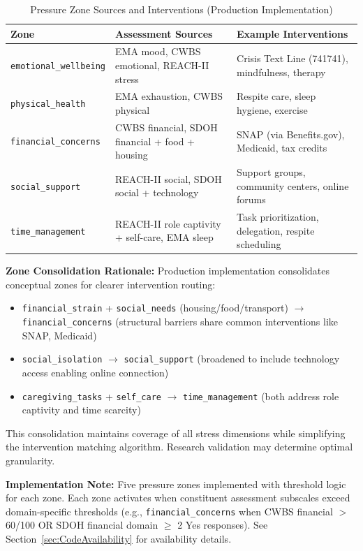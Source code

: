 \documentclass{article}
\begin{document}
\begin{table}[htbp]
\centering
\caption{Pressure Zone Sources and Interventions (Production Implementation)}
\label{table:pressure_zones}
\small
\begin{tabular}{lp{4.5cm}p{4.5cm}}
\toprule
\textbf{Zone} & \textbf{Assessment Sources} & \textbf{Example Interventions} \\
\midrule
\texttt{emotional\_wellbeing} & EMA mood, CWBS emotional, REACH-II stress & Crisis Text Line (741741), mindfulness, therapy \\
\texttt{physical\_health} & EMA exhaustion, CWBS physical & Respite care, sleep hygiene, exercise \\
\texttt{financial\_concerns} & CWBS financial, SDOH financial + food + housing & SNAP (via Benefits.gov), Medicaid, tax credits \\
\texttt{social\_support} & REACH-II social, SDOH social + technology & Support groups, community centers, online forums \\
\texttt{time\_management} & REACH-II role captivity + self-care, EMA sleep & Task prioritization, delegation, respite scheduling \\
\bottomrule
\end{tabular}
\end{table}
\textbf{Zone Consolidation Rationale:} Production implementation consolidates conceptual zones for clearer intervention routing:
\begin{itemize}
    \item \texttt{financial\_strain} + \texttt{social\_needs} (housing/food/transport) $\rightarrow$ \texttt{financial\_concerns} (structural barriers share common interventions like SNAP, Medicaid)
    \item \texttt{social\_isolation} $\rightarrow$ \texttt{social\_support} (broadened to include technology access enabling online connection)
    \item \texttt{caregiving\_tasks} + \texttt{self\_care} $\rightarrow$ \texttt{time\_management} (both address role captivity and time scarcity)
\end{itemize}

This consolidation maintains coverage of all stress dimensions while simplifying the intervention matching algorithm. Research validation may determine optimal granularity.

\textbf{Implementation Note:} Five pressure zones implemented with threshold logic for each zone. Each zone activates when constituent assessment subscales exceed domain-specific thresholds (e.g., \texttt{financial\_concerns} when CWBS financial $>$ 60/100 OR SDOH financial domain $\geq$ 2 Yes responses). See Section~\ref{sec:CodeAvailability} for availability details.
\end{document}
